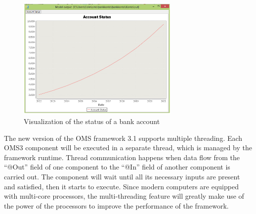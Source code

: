 \begin{figure}[h]
	\centering
	\includegraphics[width=0.7\textwidth]{pics/oms/Figure10.png}
	\caption{Visualization of the status of a bank account
 \label{fig:Visualization_Bank_Account}}	
\end{figure}
The new version of the OMS framework 3.1 supports multiple threading. Each OMS3 component will be executed in a separate thread, which is managed by the framework runtime. Thread communication happens when data flow from the “@Out” field of one component to the “@In” field of another component is carried out. The component will wait until all its necessary inputs are present and satisfied, then it starts to execute. Since modern computers are equipped with multi-core processors, the multi-threading feature will greatly make use of the power of the processors to improve the performance of the framework.
\par
